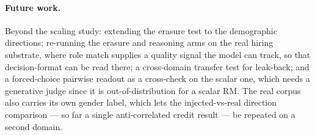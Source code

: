 \paragraph{Future work.} Beyond the scaling study: extending the erasure test to the demographic directions;
re-running the erasure and reasoning arms on the real hiring substrate, where role match supplies a quality
signal the model can track, so that decision-format \crossinf{} can be read there; a
cross-domain transfer test for leak-back; and a forced-choice pairwise readout as a cross-check on the scalar
one, which needs a generative judge since it is out-of-distribution for a scalar RM. The real corpus also
carries its own gender label, which lets the injected-vs-real direction comparison --- so far a single
anti-correlated credit result  --- be repeated on a second domain.
